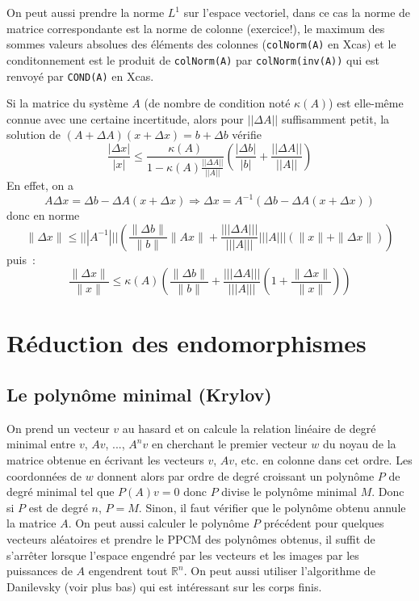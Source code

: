 \documentclass[a4paper,11pt]{book}
\begin{document}
\begin{giacjshere}
On peut aussi prendre la norme $L^1$ sur l'espace vectoriel, dans ce
cas la norme de matrice correspondante est la norme de colonne (exercice!),
le maximum des sommes valeurs absolues des \'el\'ements
des colonnes (\verb|colNorm(A)| en Xcas) et le conditonnement
est le produit de \verb|colNorm(A)| par \verb|colNorm(inv(A))|
qui est renvoy\'e par \verb|COND(A)| en Xcas.

Si la matrice du syst\`eme $A$ (de nombre de condition not\'e
$\kappa(A)$) est elle-m\^eme connue avec une
certaine incertitude, alors pour $||\Delta A||$ suffisamment petit,
la solution de
$(A+\Delta A)(x+\Delta x)=b+\Delta b$ v\'erifie
$$ \frac {|\Delta x |}{|x|}\leq
\frac{\kappa(A)}{1-\kappa(A)\frac{||\Delta A||}{||A||}}
\left(\frac{|\Delta b|}{|b|}+\frac{||\Delta A||}{||A||}
\right) $$
En effet, on a 
$$ A \Delta x =\Delta b - \Delta A(x+\Delta x)
\Rightarrow \Delta x = A^{-1}(\Delta b - \Delta A(x+\Delta x))  $$
donc en norme
$$ \| \Delta x \| \leq |||A^{-1}||| \left(
\frac{\|\Delta b\|}{\|b\|}\|Ax\|
+ \frac{||| \Delta A |||}{|||A|||} |||A||| (\|x\|+\|\Delta x\|)
\right)$$
puis~:
$$ \frac{\| \Delta x \|}{\|x\|} \leq \kappa(A)
\left(\frac{\|\Delta b\|}{\|b\|}
+ \frac{||| \Delta A |||}{|||A|||} \left(1+\frac{\| \Delta x \|}{\|x\|}\right) 
\right)$$



\section{R\'eduction des endomorphismes}
\subsection{Le polyn\^ome minimal (Krylov)}
On prend un vecteur $v$ au hasard et on calcule la relation lin\'eaire
de degr\'e minimal entre $v$, $Av$, ..., $A^nv$ en cherchant
le premier vecteur $w$ du noyau de la matrice obtenue en écrivant
les vecteurs $v$, $Av$, etc. en colonne dans cet ordre. Les
coordonnées de $w$ donnent alors par ordre de degré croissant
un polynôme $P$ de degr\'e minimal tel que $P(A)v=0$ donc
$P$ divise le polynôme minimal $M$. Donc si $P$ est de
degré $n$, $P=M$. Sinon, il faut v\'erifier que le polynôme obtenu 
annule la matrice $A$. On peut aussi calculer le polynôme $P$
précédent pour quelques vecteurs aléatoires et prendre le PPCM des
polynômes obtenus, il suffit de s'arr\^eter lorsque l'espace engendr\'e
par les vecteurs et les images par les puissances de $A$ engendrent
tout $\mathbb{R}^n$. On peut aussi utiliser l'algorithme de Danilevsky (voir
plus bas) qui est int\'eressant sur les corps finis.


\end{giacjshere}
\end{document}
